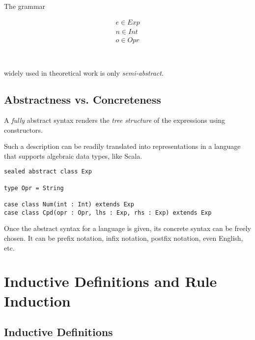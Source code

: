 \documentclass[a4paper,12pt]{article}
\newcommand{\term}[1]{\textsf{#1}}
\begin{document}
The grammar

\begin{gather*}
 e \in Exp \\
 n \in Int \\
 o \in Opr
\end{gather*}

\begin{grammar}
 \\
\end{grammar}

\noindent
widely used in theoretical work is only \emph{semi-abstract}.

\subsection{Abstractness vs. Concreteness}

A \emph{fully} abstract syntax renders the \emph{tree structure} of the expressions
using constructors.

\begin{grammar}
\end{grammar}

\noindent
Such a description can be readily translated into representations in a language that
supports \textsf{algebraic data types}, like Scala.

\begin{verbatim}
sealed abstract class Exp

type Opr = String

case class Num(int : Int) extends Exp
case class Cpd(opr : Opr, lhs : Exp, rhs : Exp) extends Exp
\end{verbatim}

Once the abstract syntax for a language is given, its concrete syntax can be freely
chosen.  It can be \term{prefix notation}, \term{infix notation}, \term{postfix
notation}, even English, etc.

\section{Inductive Definitions and Rule Induction}

\subsection{Inductive Definitions}
\end{document}
